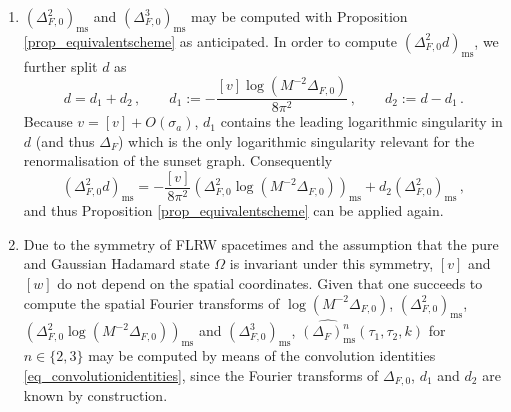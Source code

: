 \documentclass[a4paper,10pt,twoside]{article}
\numberwithin{equation}{section}
\newcounter{and}
\def\ms{\mathrm{ms}}
\def\beq{\begin{equation}}
\def\eeq{\end{equation}}
\theoremstyle{plain}
\theoremstyle{definition}
\begin{document}
\begin{enumerate}
\item $\left(\Delta^2_{F,0}\right)_\ms$ and  $\left(\Delta^3_{F,0}\right)_\ms$ may be computed with Proposition \ref{prop_equivalentscheme} as anticipated. In order to compute $\left(\Delta^2_{F,0} d\right)_\ms$, we further split $d$ as
\beq\label{eq_dsplit}d=d_1+d_2\,,\qquad d_1:= -\frac{[v] \log \left(M^{-2} \Delta_{F,0}\right)}{8\pi^2}\,,\qquad d_2:=d-d_1\,.\eeq
Because $v=[v]+O(\sigma_a)$, $d_1$ contains the leading logarithmic singularity in $d$ (and thus $\Delta_F$) which is the only logarithmic singularity relevant for the renormalisation of the sunset graph. Consequently
%
\beq\label{eq_fishsunsetalt2}\left(\Delta^2_{F,0} d\right)_\ms=- \frac{[v]}{8\pi^2}\left(\Delta^2_{F,0}\log \left(M^{-2} \Delta_{F,0}\right)\right)_\ms + d_2 \left(\Delta^2_{F,0}\right)_\ms\,,\eeq
%
and thus Proposition \ref{prop_equivalentscheme} can be applied again.
\item Due to the symmetry of FLRW spacetimes and the assumption that the pure and Gaussian Hadamard state $\Omega$ is invariant under this symmetry, $[v]$ and $[w]$ do not depend on the spatial coordinates. Given that one succeeds to compute the spatial Fourier transforms of $\log \left(M^{-2} \Delta_{F,0}\right)$, $\left(\Delta^2_{F,0}\right)_\ms$, $\left(\Delta^2_{F,0}\log \left(M^{-2} \Delta_{F,0}\right)\right)_\ms$ and  $\left(\Delta^3_{F,0}\right)_\ms$, $\widehat{(\Delta_{F})^n_\ms}(\tau_1,\tau_2,k)$ for $n\in\{2,3\}$ may be computed by means of the convolution identities \eqref{eq_convolutionidentities}, since the Fourier transforms of $\Delta_{F,0}$, $d_1$ and $d_2$ are known by construction.
\end{enumerate}
\end{document}
